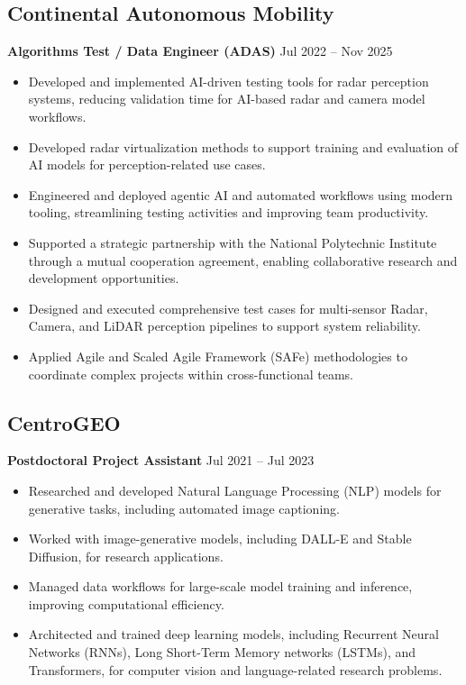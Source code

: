 \documentclass[11pt]{article}
\begin{document}
\subsection{Continental Autonomous Mobility}
\textbf{Algorithms Test / Data Engineer (ADAS)} \hfill Jul 2022 -- Nov 2025
\begin{itemize}
\item Developed and implemented AI-driven testing tools for radar perception systems, reducing validation time for AI-based radar and camera model workflows.
\item Developed radar virtualization methods to support training and evaluation of AI models for perception-related use cases.
\item Engineered and deployed agentic AI and automated workflows using modern tooling, streamlining testing activities and improving team productivity.
\item Supported a strategic partnership with the National Polytechnic Institute through a mutual cooperation agreement, enabling collaborative research and development opportunities.
\item Designed and executed comprehensive test cases for multi-sensor Radar, Camera, and LiDAR perception pipelines to support system reliability.
\item Applied Agile and Scaled Agile Framework (SAFe) methodologies to coordinate complex projects within cross-functional teams.
\end{itemize}

\subsection{CentroGEO}
\textbf{Postdoctoral Project Assistant} \hfill Jul 2021 -- Jul 2023
\begin{itemize}
\item Researched and developed Natural Language Processing (NLP) models for generative tasks, including automated image captioning.
\item Worked with image-generative models, including DALL-E and Stable Diffusion, for research applications.
\item Managed data workflows for large-scale model training and inference, improving computational efficiency.
\item Architected and trained deep learning models, including Recurrent Neural Networks (RNNs), Long Short-Term Memory networks (LSTMs), and Transformers, for computer vision and language-related research problems.
\end{itemize}
\end{document}
